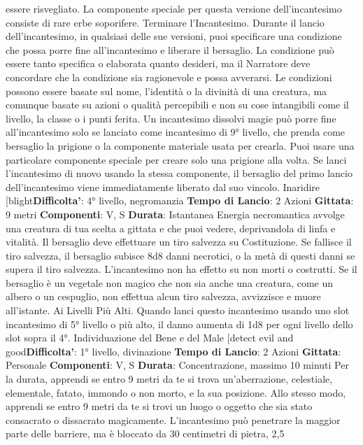 \begin{multicols}{2}
essere risvegliato. La componente speciale per questa
versione dell’incantesimo consiste di rare erbe
soporifere.
Terminare l’Incantesimo. Durante il lancio
dell’incantesimo, in qualsiasi delle sue versioni, puoi
specificare una condizione che possa porre fine
all’incantesimo e liberare il bersaglio. La condizione può
essere tanto specifica o elaborata quanto desideri, ma il
Narratore deve concordare che la condizione sia ragionevole
e possa avverarsi. Le condizioni possono essere
basate sul nome, l’identità o la divinità di una creatura,
ma comunque basate su azioni o qualità percepibili e
non su cose intangibili come il livello, la classe o i punti
ferita.
Un incantesimo dissolvi magie può porre fine
all’incantesimo solo se lanciato come incantesimo di 9°
livello, che prenda come bersaglio la prigione o la
componente materiale usata per crearla.
Puoi usare una particolare componente speciale per
creare solo una prigione alla volta. Se lanci
l’incantesimo di nuovo usando la stessa componente, il
bersaglio del primo lancio dell’incantesimo viene
immediatamente liberato dal suo vincolo.
Inaridire
[blight\textbf{Difficolta'}:
4° livello, negromanzia
\textbf{Tempo di Lancio}: 2 Azioni
\textbf{Gittata}: 9 metri
\textbf{Componenti}: V, S
\textbf{Durata}: Istantanea
Energia necromantica avvolge una creatura di tua
scelta a gittata e che puoi vedere, deprivandola di linfa
e vitalità. Il bersaglio deve effettuare un tiro salvezza su
Costituzione. Se fallisce il tiro salvezza, il bersaglio
subisce 8d8 danni necrotici, o la metà di questi danni se
supera il tiro salvezza. L’incantesimo non ha effetto su
non morti o costrutti.
Se il bersaglio è un vegetale non magico che non sia
anche una creatura, come un albero o un cespuglio,
non effettua alcun tiro salvezza, avvizzisce e muore
all’istante.
Ai Livelli Più Alti. Quando lanci questo incantesimo
usando uno slot incantesimo di 5° livello o più alto, il
danno aumenta di 1d8 per ogni livello dello slot sopra il
4°.
Individuazione del Bene e del Male
[detect evil and good\textbf{Difficolta'}:
1° livello, divinazione
\textbf{Tempo di Lancio}: 2 Azioni
\textbf{Gittata}: Personale
\textbf{Componenti}: V, S
\textbf{Durata}: Concentrazione, massimo 10 minuti
Per la durata, apprendi se entro 9 metri da te si trova
un’aberrazione, celestiale, elementale, fatato, immondo
o non morto, e la sua posizione. Allo stesso modo,
apprendi se entro 9 metri da te si trovi un luogo o
oggetto che sia stato consacrato o dissacrato
magicamente.
L’incantesimo può penetrare la maggior parte delle
barriere, ma è bloccato da 30 centimetri di pietra, 2,5

\end{multicols}
